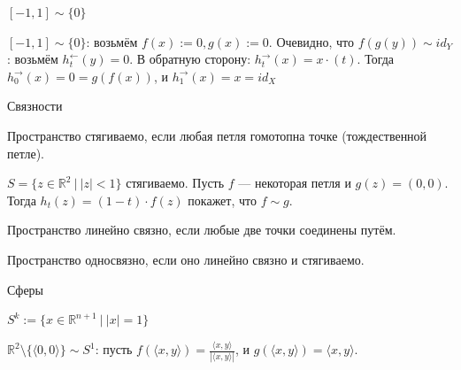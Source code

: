 \documentclass[aspectratio=169,dvipsnames,usenames]{beamer}
\begin{document}
\begin{frame}{$[-1,1] \sim \{0\}$}

$[-1,1] \sim \{0\}$: возьмём $f(x) := 0, g(x) := 0$. Очевидно, что $f(g(y)) \sim id_Y$: возьмём $h^\leftarrow_t(y) = 0$.
В обратную сторону: $h^\rightarrow_t(x) = x\cdot (t)$. Тогда $h^\rightarrow_0(x) = 0 = g(f(x))$, и
$h^\rightarrow_1(x) = x = id_X$

\begin{center}\end{center}\vspace{-0.3cm}

\end{frame}

\begin{frame}{Связности}
\begin{dfn}
Пространство стягиваемо, если любая петля гомотопна точке (тождественной петле).
\end{dfn}

\begin{exm}
$S = \{z\in\mathbb{R}^2\ |\ |z| < 1\}$ стягиваемо. Пусть $f$ --- некоторая петля и $g(z) = (0,0)$.
Тогда $h_t(z) = (1-t)\cdot f(z)$ покажет, что $f \sim g$.
\end{exm}

\begin{dfn}
Пространство линейно связно, если любые две точки соединены путём.

Пространство односвязно, если оно линейно связно и стягиваемо.
\end{dfn}

\end{frame}

\begin{frame}{Сферы}
\begin{dfn}
$S^k := \{ x \in \mathbb{R}^{n+1}\ |\ |x| = 1\}$
\end{dfn}
\begin{exm}
$\mathbb{R}^2\setminus\{\langle 0,0\rangle\} \sim S^1$: пусть $f(\langle x,y \rangle) = \frac{\langle x, y \rangle}{|\langle x, y \rangle|}$, и $g(\langle x,y\rangle) = \langle x, y \rangle$.
\end{exm}
\end{frame}
\end{document}
